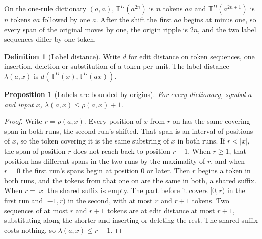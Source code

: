 \documentclass[11pt,a4paper]{article}
\theoremstyle{definition}
\newtheorem{definition}{Definition}
\theoremstyle{plain}
\newtheorem{proposition}{Proposition}
\newcommand{\T}{\mathbb{T}}
\begin{document}
On the one-rule dictionary \((a,a)\), \(\T^D(a^{2n})\) is \(n\) tokens \(aa\) and \(\T^D(a^{2n+1})\) is \(n\) tokens
\(aa\) followed by one \(a\). After the shift the first \(aa\) begins at minus one, so every span of the original moves
by one, the origin ripple is \(2n\), and the two label sequences differ by one token.

\begin{definition}[Label distance]\label{def:label}
Write \(d\) for edit distance on token sequences, one insertion, deletion or substitution of a token per unit. The label
distance \(\lambda(a, x)\) is \(d(\T^D(x), \T^D(ax))\).
\end{definition}


\begin{proposition}[Labels are bounded by origins]\label{prop:labels}
For every dictionary, symbol \(a\) and input \(x\), \(\lambda(a, x) \le \rho(a, x) + 1\).
\end{proposition}

\begin{proof}
Write \(r = \rho(a, x)\). Every position of \(x\) from \(r\) on has the same covering span in both runs, the second
run's shifted. That span is an interval of positions of \(x\), so the token covering it is the same substring of \(x\)
in both runs. If \(r < |x|\), the span of position \(r\) does not reach back to position \(r - 1\). When \(r \ge 1\),
that position has different spans in the two runs by the maximality of \(r\), and when \(r = 0\) the first run's spans
begin at position \(0\) or later. Then \(r\) begins a token in both runs, and the tokens from that one on are the same
in both, a shared suffix. When \(r = |x|\) the shared suffix is empty. The part before it covers \([0, r)\) in the first
run and \([-1, r)\) in the second, with at most \(r\) and \(r + 1\) tokens. Two sequences of at most \(r\) and \(r + 1\)
tokens are at edit distance at most \(r + 1\), substituting along the shorter and inserting or deleting the rest. The
shared suffix costs nothing, so \(\lambda(a, x) \le r + 1\).
\end{proof}

\end{document}

